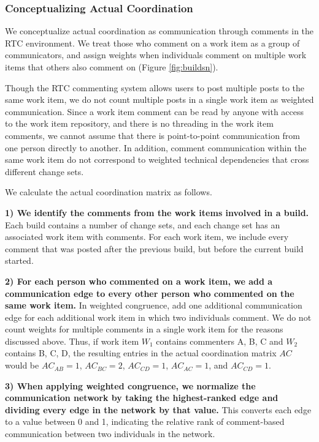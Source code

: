 \subsubsection{Conceptualizing Actual Coordination}

We conceptualize actual coordination as communication through comments in the
RTC environment. We treat those who comment on a work item as a group of communicators, and assign weights when individuals comment on multiple work items that others also comment on (Figure \ref{fig:buildsn}).

Though the RTC commenting system allows users to post multiple posts to the same work item, we do not count multiple posts in a single work item as weighted communication.
Since a work item comment can be read by anyone with access to the work item repository, and there is no threading in the work item comments, we cannot assume that there is point-to-point communication from one person directly to another.
In addition, comment communication within the same work item do not correspond to weighted technical dependencies that cross different change sets.

We calculate the actual coordination matrix as follows.

\textbf{1) We identify the comments from the work items involved in a build.} Each build contains a number of change sets, and each change set has an associated work item with comments. For each work item, we include every comment that was posted after the previous build, but before the current build started.

\textbf{2) For each person who commented on a work item, we add a communication edge to every other person who commented on the same work item.} In weighted congruence, add one additional communication edge for each additional work item in which two individuals comment. We do not count weights for multiple comments in a single work item for the reasons discussed above. Thus, if work item $W_1$ contains commenters {A, B, C} and $W_2$ contains {B, C, D}, the resulting entries in the actual coordination matrix $AC$ would be $AC_{AB}=1$, $AC_{BC}=2$, $AC_{CD}=1$, $AC_{AC}=1$, and $AC_{CD}=1$.

\textbf{3) When applying weighted congruence, we normalize the communication network by taking the highest-ranked edge and dividing every edge in the network by that value.} This converts each edge to a value between 0 and 1, indicating the relative rank of comment-based communication between two individuals in the network.

